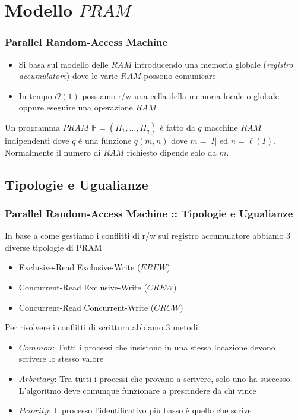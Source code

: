 \documentclass{beamer}
\newcommand{\bigO}{\ensuremath{\mathcal{O}}} %
\begin{document}
\section{Modello $PRAM$}
\begin{frame}
	\frametitle{Parallel Random-Access Machine} %
	\begin{itemize}
		\item Si basa sul modello delle $RAM$ introducendo una memoria globale (\emph{registro accumulatore}) dove le varie $RAM$ possono comunicare
		\item In tempo $\bigO{(1)}$ possiamo r/w una cella della memoria locale o globale oppure eseguire una operazione $RAM$
	\end{itemize}
	Un programma $PRAM$ $\mathbb{P} = (\Pi_1,\dots,\Pi_q)$ è fatto da $q$ macchine $RAM$ indipendenti dove $q$ è una funzione $q(m,n)$ dove $m = |I|$ ed $n= \ell(I)$.\\
	Normalmente il numero di $RAM$ richiesto dipende solo da $m$.
\end{frame}

\subsection{Tipologie e Ugualianze}
\begin{frame}
	\frametitle{Parallel Random-Access Machine :: Tipologie e Ugualianze} %
	In base a come gestiamo i conflitti di r/w sul registro accumulatore abbiamo 3 diverse tipologie di PRAM
	\begin{itemize}
		\item Exclusive-Read Exclusive-Write ($EREW$) 
		\item Concurrent-Read Exclusive-Write ($CREW$)
		\item Concurrent-Read Concurrent-Write ($CRCW$)
	\end{itemize}
	Per risolvere i conflitti di scrittura abbiamo 3 metodi:
	\begin{itemize}
		\item $Common$: Tutti i processi che insistono in una stessa locazione devono scrivere lo stesso valore 
		\item $Arbritary$: Tra tutti i processi che provano a scrivere, solo uno ha successo. L'algoritmo deve comunque funzionare a prescindere da chi vince
		\item $Priority$: Il processo l'identificativo più basso è quello che scrive
	\end{itemize}
\end{frame}
\end{document}
